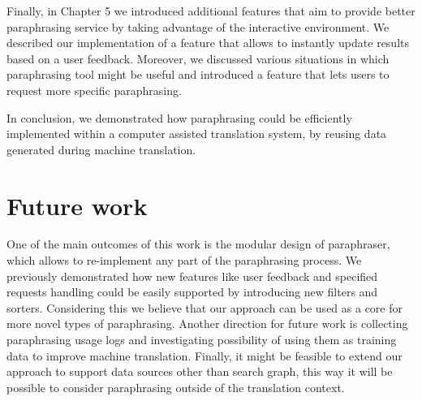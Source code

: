 Finally, in Chapter 5 we introduced additional features that aim to provide better paraphrasing service by taking advantage of the interactive environment. We described our implementation of a feature that allows to instantly update results based on a user feedback. Moreover, we discussed various situations in which paraphrasing tool might be useful and introduced a feature that lets users to request more specific paraphrasing.

In conclusion, we demonstrated how paraphrasing could be efficiently implemented within a computer assisted translation system, by reusing data generated during machine translation. 

\section{Future work}

One of the main outcomes of this work is the modular design of paraphraser, which allows to re-implement any part of the paraphrasing process. We previously demonstrated how new features like user feedback and specified requests handling could be easily supported by introducing new filters and sorters. Considering this we believe that our approach can be used as a core for more novel types of paraphrasing. Another direction for future work is collecting paraphrasing usage logs and investigating possibility of using them as training data to improve machine translation. Finally, it might be feasible to extend our approach to support data sources other than search graph, this way it will be possible to consider paraphrasing outside of the translation context.  